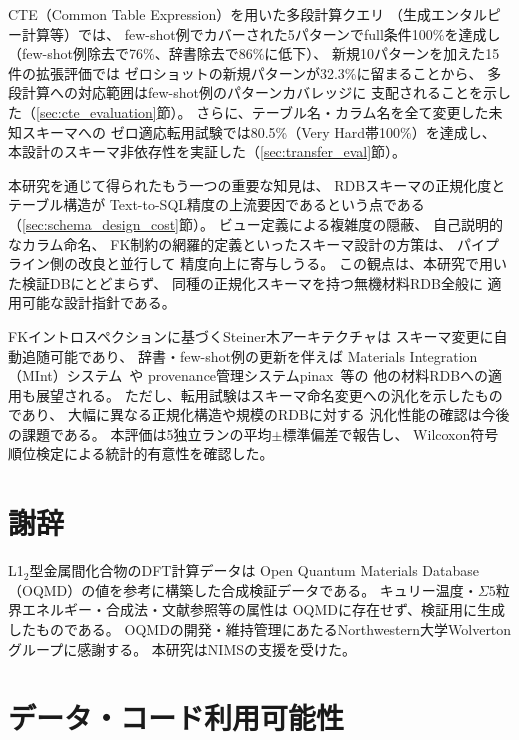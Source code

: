 \documentclass[5p,twocolumn]{elsarticle}
\begin{document}
CTE（Common Table Expression）を用いた多段計算クエリ
（生成エンタルピー計算等）では、
few-shot例でカバーされた5パターンでfull条件100\%を達成し
（few-shot例除去で76\%、辞書除去で86\%に低下）、
新規10パターンを加えた15件の拡張評価では
ゼロショットの新規パターンが32.3\%に留まることから、
多段計算への対応範囲はfew-shot例のパターンカバレッジに
支配されることを示した（\ref{sec:cte_evaluation}節）。
さらに、テーブル名・カラム名を全て変更した未知スキーマへの
ゼロ適応転用試験では80.5\%（Very Hard帯100\%）を達成し、
本設計のスキーマ非依存性を実証した（\ref{sec:transfer_eval}節）。

本研究を通じて得られたもう一つの重要な知見は、
RDBスキーマの正規化度とテーブル構造が
Text-to-SQL精度の上流要因であるという点である
（\ref{sec:schema_design_cost}節）。
ビュー定義による複雑度の隠蔽、
自己説明的なカラム命名、
FK制約の網羅的定義といったスキーマ設計の方策は、
パイプライン側の改良と並行して
精度向上に寄与しうる。
この観点は、本研究で用いた検証DBにとどまらず、
同種の正規化スキーマを持つ無機材料RDB全般に
適用可能な設計指針である。

FKイントロスペクションに基づくSteiner木アーキテクチャは
スキーマ変更に自動追随可能であり、
辞書・few-shot例の更新を伴えば
Materials Integration（MInt）システム~\cite{minamoto2020mint}や
provenance管理システムpinax~\cite{minamoto2026pinax}等の
他の材料RDBへの適用も展望される。
ただし、転用試験はスキーマ命名変更への汎化を示したものであり、
大幅に異なる正規化構造や規模のRDBに対する
汎化性能の確認は今後の課題である。
本評価は5独立ランの平均$\pm$標準偏差で報告し、
Wilcoxon符号順位検定による統計的有意性を確認した。

\section*{謝辞}

L1$_2$型金属間化合物のDFT計算データは
Open Quantum Materials Database（OQMD）の値を参考に構築した合成検証データである。
キュリー温度・$\Sigma 5$粒界エネルギー・合成法・文献参照等の属性は
OQMDに存在せず、検証用に生成したものである。
OQMDの開発・維持管理にあたるNorthwestern大学Wolvertonグループに感謝する。
本研究はNIMSの支援を受けた。

\section*{データ・コード利用可能性}
\end{document}
